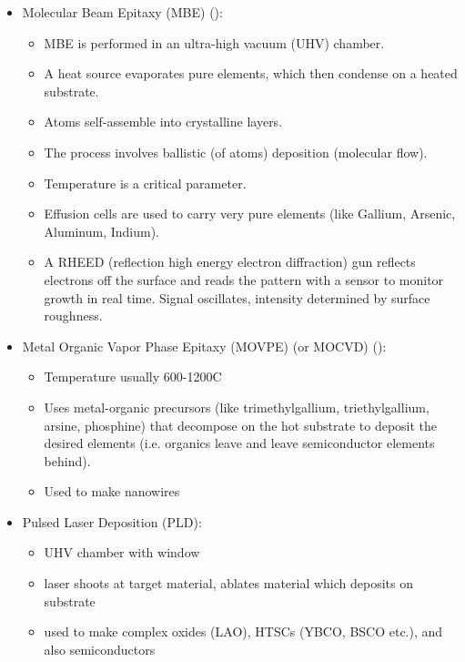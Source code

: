 \begin{itemize}
    \item Molecular Beam Epitaxy (MBE) ():
          \begin{itemize}
              \item MBE is performed in an ultra-high vacuum (UHV) chamber.
              \item A heat source evaporates pure elements, which then condense on a heated substrate.
              \item Atoms self-assemble into crystalline layers.
              \item The process involves ballistic (of atoms) deposition (molecular flow).
              \item Temperature is a critical parameter.
              \item Effusion cells are used to carry very pure elements (like Gallium, Arsenic, Aluminum, Indium).
              \item A RHEED (reflection high energy electron diffraction) gun reflects electrons off the surface and reads the pattern with a sensor to monitor growth in real time. Signal oscillates, intensity determined by surface roughness.
          \end{itemize}

    \item Metal Organic Vapor Phase Epitaxy (MOVPE) (or MOCVD) ():
          \begin{itemize}
              \item Temperature usually 600-1200C
              \item Uses metal-organic precursors (like trimethylgallium, triethylgallium, arsine, phosphine) that decompose on the hot substrate to deposit the desired elements (i.e. organics leave and leave semiconductor elements behind).
              \item Used to make nanowires
          \end{itemize}

    \item Pulsed Laser Deposition (PLD):
          \begin{itemize}
              \item UHV chamber with window
              \item laser shoots at target material, ablates material which deposits on substrate
              \item used to make complex oxides (LAO), HTSCs (YBCO, BSCO etc.), and also semiconductors
          \end{itemize}
\end{itemize}

